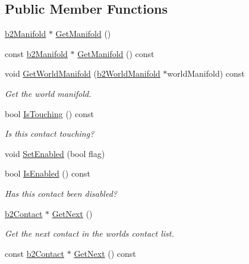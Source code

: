 \subsection*{Public Member Functions}
\begin{DoxyCompactItemize}
\item 
\mbox{\hyperlink{structb2_manifold}{b2\+Manifold}} $\ast$ \mbox{\hyperlink{classb2_contact_ab0597077b23615476327f9b32d9c4979}{Get\+Manifold}} ()
\item 
const \mbox{\hyperlink{structb2_manifold}{b2\+Manifold}} $\ast$ \mbox{\hyperlink{classb2_contact_a4a0a4ee449a4a6fbb8c39567fa10bc2b}{Get\+Manifold}} () const
\item 
void \mbox{\hyperlink{classb2_contact_a7f5645863f6197fa28cc1baafbd11255}{Get\+World\+Manifold}} (\mbox{\hyperlink{structb2_world_manifold}{b2\+World\+Manifold}} $\ast$world\+Manifold) const
\begin{DoxyCompactList}\small\item\em Get the world manifold. \end{DoxyCompactList}\item 
bool \mbox{\hyperlink{classb2_contact_a681346f93e2a27403383775a752c06a0}{Is\+Touching}} () const
\begin{DoxyCompactList}\small\item\em Is this contact touching? \end{DoxyCompactList}\item 
void \mbox{\hyperlink{classb2_contact_a6edf582f8c161d6632854cddefe55a0c}{Set\+Enabled}} (bool flag)
\item 
bool \mbox{\hyperlink{classb2_contact_af81964f40dce556efbc83ae760f166b0}{Is\+Enabled}} () const
\begin{DoxyCompactList}\small\item\em Has this contact been disabled? \end{DoxyCompactList}\item 
\mbox{\hyperlink{classb2_contact}{b2\+Contact}} $\ast$ \mbox{\hyperlink{classb2_contact_aebfebb1e4b27dc0bd7aa120093e3d650}{Get\+Next}} ()
\begin{DoxyCompactList}\small\item\em Get the next contact in the world\textquotesingle{}s contact list. \end{DoxyCompactList}\item 
const \mbox{\hyperlink{classb2_contact}{b2\+Contact}} $\ast$ \mbox{\hyperlink{classb2_contact_a5231c6fe1b2b374ac9909a248aee0c98}{Get\+Next}} () const
\item 

\end{DoxyCompactItemize}
